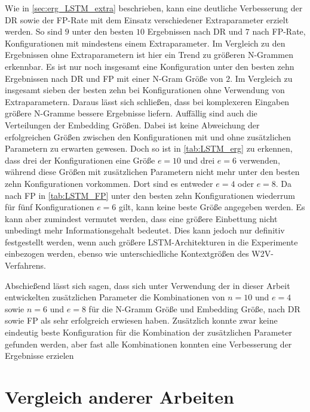 Wie in \autoref{sec:erg_LSTM_extra} beschrieben, kann eine deutliche Verbesserung der \ac{DR} sowie  der \ac{FP}-Rate mit dem Einsatz verschiedener Extraparameter erzielt werden.
So sind $9$ unter den besten $10$ Ergebnissen nach \ac{DR} und $7$ nach \ac{FP}-Rate, Konfigurationen mit mindestens einem Extraparameter.
Im Vergleich zu den Ergebnissen ohne Extraparametern ist hier ein Trend zu größeren N-Grammen erkennbar.
Es ist nur noch insgesamt eine Konfiguration unter den besten zehn Ergebnissen nach \ac{DR} und \ac{FP} mit einer N-Gram Größe von $2$.
Im Vergleich zu insgesamt sieben  der besten zehn bei Konfigurationen ohne Verwendung von Extraparametern.
Daraus lässt sich schließen, dass bei komplexeren Eingaben größere N-Gramme bessere Ergebnisse liefern. 
Auffällig sind auch die Verteilungen der Embedding Größen.
Dabei ist keine Abweichung der erfolgreichen Größen zwischen den Konfigurationen mit und ohne zusätzlichen Parametern zu erwarten gewesen.
Doch so ist in \autoref{tab:LSTM_erg} zu erkennen, dass drei der Konfigurationen eine Größe $e=10$ und drei $e=6$ verwenden, während diese Größen mit zusätzlichen Parametern nicht mehr unter den besten zehn Konfigurationen vorkommen.
Dort sind es entweder $e=4$ oder $e=8$.
Da nach \ac{FP} in \autoref{tab:LSTM_FP} unter den besten zehn Konfigurationen wiederrum für fünf Konfigurationen $e=6$ gilt, kann keine beste Größe angegeben werden.
Es kann aber zumindest vermutet werden, dass eine größere Einbettung nicht unbedingt mehr Informationsgehalt bedeutet.
Dies kann jedoch nur definitiv festgestellt werden, wenn auch größere \ac{LSTM}-Architekturen in die Experimente einbezogen werden, ebenso wie unterschiedliche Kontextgrößen des \ac{W2V}-Verfahrens.

Abschießend lässt sich sagen, dass sich unter Verwendung der in dieser Arbeit entwickelten zusätzlichen Parameter die Kombinationen von $n=10$ und $e=4$ sowie $n=6$ und $e=8$ für die N-Gramm Größe und Embedding Größe, nach \ac{DR} sowie \ac{FP} als sehr erfolgreich erwiesen haben.
Zusätzlich konnte zwar keine eindeutig beste Konfiguration für die Kombination der zusätzlichen Parameter gefunden werden, aber fast alle Kombinationen konnten eine Verbesserung der Ergebnisse erzielen

\section{Vergleich anderer Arbeiten}\label{sec:folgerungen_vgl}

